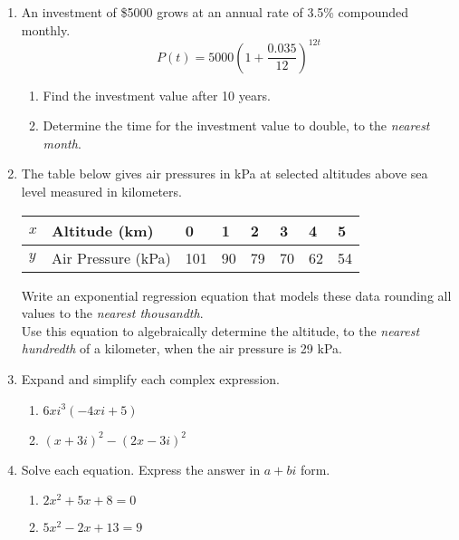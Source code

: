 \documentclass[12pt, twoside]{article}
\begin{document}
\begin{enumerate}[itemsep=0.5cm]
\newpage
\item An investment of \$5000 grows at an annual rate of 3.5\% compounded monthly. 
$$P(t)=5000(1+\frac{0.035}{12})^{12t}$$
\begin{enumerate}
    \item Find the investment value after 10 years. \vspace{2cm}
    \item Determine the time for the investment value to double, to the \emph{nearest month}. \vspace{3cm}
\end{enumerate}

\item The table below gives air pressures in kPa at selected altitudes above sea level measured in kilometers.
\begin{center}
    \begin{tabular}{|p{1cm}|p{4cm}|p{1cm}|p{1cm}|p{1cm}|p{1cm}|p{1cm}|p{1cm}|}
        \hline
        $x$ & Altitude (km) & 0 & 1 & 2 & 3 & 4 & 5 \\
        \hline
        $y$ & Air Pressure (kPa) & 101 & 90 & 79 & 70 & 62 & 54 \\[0.25cm]
        \hline
    \end{tabular}
    \end{center}
    Write an exponential regression equation that models these data rounding all values to the \emph{nearest thousandth}. \\[2cm]
    Use this equation to algebraically determine the altitude, to the \emph{nearest hundredth} of a kilometer, when the air pressure is 29 kPa. %

\newpage
\item Expand and simplify each complex expression.
\begin{multicols}{2}
\begin{enumerate}
    \item $6xi^3(-4xi+5)$
    \item $(x+3i)^2-(2x-3i)^2$
\end{enumerate}
\end{multicols} \vspace{4cm}

\item Solve each equation. Express the answer in $a+bi$ form.
\begin{multicols}{2}
\begin{enumerate}[itemsep=0.5cm]
    \item $2x^2+5x+8=0$
    \item $5x^2-2x+13=9$ %
\end{enumerate}
\end{multicols} \vspace{4cm}


\end{enumerate}
\end{document}
